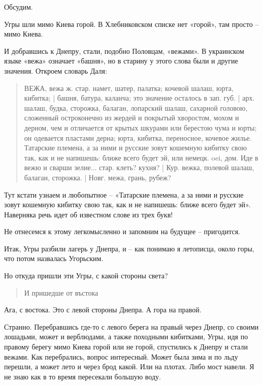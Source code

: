Обсудим.

Угры шли мимо Киева горой. В Хлебниковском списке нет «горой», там просто – мимо Киева.

И добравшись к Днепру, стали, подобно Половцам, «вежами». В украинском языке «вежа» означает «башня», но в старину у этого слова были и другие значения. Откроем словарь Даля:

\begin{quotation}
ВЕЖА, вежа ж. стар. намет, шатер, палатка; кочевой шалаш, юрта, кибитка; | башня, батура, каланча; это значение осталось в зап. губ. | арх. шалаш, будка, сторожка, балаган, лопарский шалаш, сахарной головою, сложенный остроконечно из жердей и покрытый хворостом, мохом и дерном, чем и отличается от крытых шкурами или берестою чума и юрты; он одевается пластами дерна; юрта, кибитка, переносное, кочевое жилье. Татарские племена, а за ними и русские зовут кошемную кибитку свою так, как и не напишешь: ближе всего будет эй, или немецк. oei, дом. Иде в вежю и сварши зелие... стар. клеть? кухня? | Кур. вежка, полевой шалаш, балаган, сторожка. | Новг. межа, грань, рубеж?
\end{quotation} 

Тут кстати узнаем и любопытное – «Татарские племена, а за ними и русские зовут кошемную кибитку свою так, как и не напишешь: ближе всего будет эй». Наверняка речь идет об известном слове из трех букв! 

Не отнесемся к этому легкомысленно и запомним на будущее – пригодится. 

Итак, Угры разбили лагерь у Днепра, и – как понимаю я летописца, около горы, что потом назвалась Угорьским.

Но откуда пришли эти Угры, с какой стороны света?

\begin{quotation}
И пришедше от въстока
\end{quotation}

Ага, с востока. Это с левой стороны Днепра. А гора на правой.

Странно. Перебравшись где-то с левого берега на правый через Днепр, со своими лошадьми, может и верблюдами, а также походными кибитками, Угры, идя по правому берегу мимо Киева горой или не горой, спустились к Днепру и стали вежами. Как перебрались, вопрос интересный. Может была зима и по льду перешли, а может лето и через брод какой. Или на плотах. Либо мост навели. Я не знаю как в то время пересекали большую воду.


